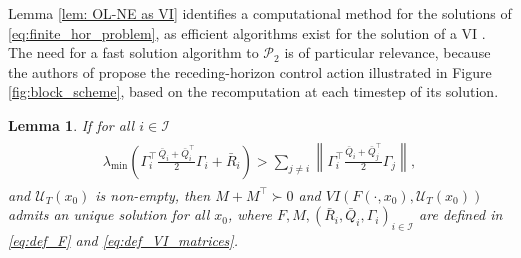 \documentclass[letterpaper, 10 pt, conference]{ieeeconf}  %
\newcommand{\mc}{\mathcal}
\newtheorem{lemma}{Lemma}
\begin{document}
Lemma \ref{lem: OL-NE as VI} identifies a computational method for the solutions of \eqref{eq:finite_hor_problem}, as efficient algorithms exist for the solution of a VI \cite{facchinei2003finite}. The need for a fast solution algorithm to $\mc P_2$ is of particular relevance, because the authors of \cite{benenati2024linear} propose the receding-horizon control action illustrated in Figure \ref{fig:block_scheme}, based on the recomputation at each timestep of its solution. 
\iffalse
\begin{lemma}
    If for all $i\in\mc I$
    \begin{align} \label{eq:gerschgorin_criterion}
    \begin{split}
    \lambda_{\text{min}}\left(\Gamma_i^{\top}\frac{\bar{Q}_i + \bar{Q}_i^{\top}}{2}\Gamma_i + \bar{R}_i\right) > \sum_{j\neq i} \left\| \Gamma_i^\top\frac{\bar{Q}_i+\bar{Q}_j^{\top}}{2}\Gamma_j \right\|,
    \end{split}
\end{align}
    and $\mc U_T(x_0)$ is non-empty, then $M+M^{\top}\succ 0$ and $VI(F(\cdot, x_0), \mc U_T(x_0))$ admits an unique solution for all $x_0$, where $F,M, (\bar{R}_i,\bar{Q}_i, \Gamma_i)_{i\in\mc I}$ are defined in \eqref{eq:def_F} and \eqref{eq:def_VI_matrices}.
\end{lemma}
\end{document}
